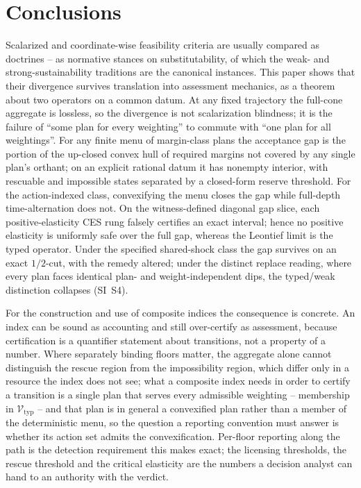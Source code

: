 \documentclass[preprint,11pt,authoryear]{elsarticle}
\theoremstyle{definition}
\theoremstyle{remark}
\newcommand{\Vtyp}{\mathcal{V}_{\mathrm{typ}}}
\begin{document}
\section{Conclusions}\label{sec:conclusions}

Scalarized and coordinate-wise feasibility criteria are usually compared as doctrines -- as normative stances on substitutability, of which the weak- and strong-sustainability traditions are the canonical instances. This paper shows that their divergence survives translation into assessment mechanics, as a theorem about two operators on a common datum. At any fixed trajectory the full-cone aggregate is lossless, so the divergence is not scalarization blindness; it is the failure of ``some plan for every weighting'' to commute with ``one plan for all weightings''. For any finite menu of margin-class plans the acceptance gap is the portion of the up-closed convex hull of required margins not covered by any single plan's orthant; on an explicit rational datum it has nonempty interior, with rescuable and impossible states separated by a closed-form reserve threshold. For the action-indexed class, convexifying the menu closes the gap while full-depth time-alternation does not. On the witness-defined diagonal gap slice, each positive-elasticity CES rung falsely certifies an exact interval; hence no positive elasticity is uniformly safe over the full gap, whereas the Leontief limit is the typed operator. Under the specified shared-shock class the gap survives on an exact $1/2$-cut, with the remedy altered; under the distinct replace reading, where every plan faces identical plan- and weight-independent dips, the typed/weak distinction collapses (SI~S4).

For the construction and use of composite indices the consequence is concrete. An index can be sound as accounting and still over-certify as assessment, because certification is a quantifier statement about transitions, not a property of a number. Where separately binding floors matter, the aggregate alone cannot distinguish the rescue region from the impossibility region, which differ only in a resource the index does not see; what a composite index needs in order to certify a transition is a single plan that serves every admissible weighting -- membership in $\Vtyp$ -- and that plan is in general a convexified plan rather than a member of the deterministic menu, so the question a reporting convention must answer is whether its action set admits the convexification. Per-floor reporting along the path is the detection requirement this makes exact; the licensing thresholds, the rescue threshold and the critical elasticity are the numbers a decision analyst can hand to an authority with the verdict.
\end{document}
